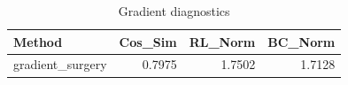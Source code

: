 \begin{table}[htbp]
\centering
\caption{Gradient diagnostics}
\label{tab:grad-diag}
\begin{tabular}{lrrr}
\toprule
\textbf{Method} & \textbf{Cos\_Sim} & \textbf{RL\_Norm} & \textbf{BC\_Norm} \\
\midrule
gradient\_surgery & 0.7975 & 1.7502 & 1.7128 \\
\bottomrule
\end{tabular}
\end{table}